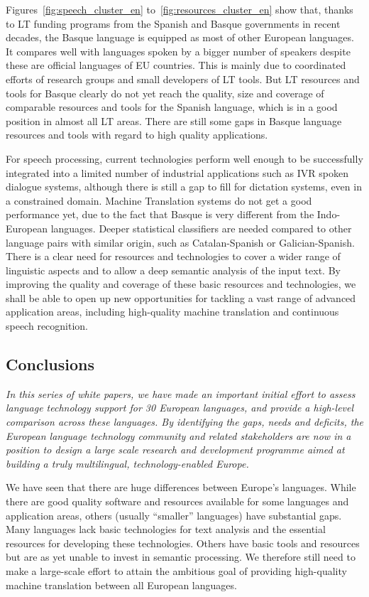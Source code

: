 \begin{multicols}{2}
Figures~\ref{fig:speech_cluster_en} to~\ref{fig:resources_cluster_en} show that, thanks to LT funding programs from the Spanish and Basque governments in recent decades, the Basque language is equipped as most of other European languages. It compares well with languages spoken by a bigger number of speakers despite these are official languages of EU countries. This is mainly due to coordinated efforts of research groups and small developers of LT tools. But LT resources and tools for Basque clearly do not yet reach the quality, size and coverage of comparable resources and tools for the Spanish language, which is in a good position in almost all LT areas. There are still some gaps in Basque language resources and tools with regard to high quality applications. 

    For speech processing, current technologies perform well enough to be successfully integrated into a limited number of industrial applications such as IVR spoken dialogue systems, although there is still a gap to fill for dictation systems, even in a constrained domain. Machine Translation systems do not get a good performance yet, due to the fact that Basque is very different from the Indo-European languages. Deeper statistical classifiers are needed compared to other language pairs with similar origin, such as Catalan-Spanish or Galician-Spanish. There is a clear need for resources and technologies to cover a wider range of linguistic aspects and to allow a deep semantic analysis of the input text. By improving the quality and coverage of these basic resources and technologies, we shall be able to open up new opportunities for tackling a vast range of advanced application areas, including high-quality machine translation and continuous speech recognition.  

\subsection{Conclusions}

    \emph{In this series of white papers, we have made an important initial effort to assess language technology support for 30 European languages, and provide a high-level comparison across these languages. By identifying the gaps, needs and deficits, the European language technology community and related stakeholders are now in a position to design a large scale research and development programme aimed at building a truly multilingual, technology-enabled Europe.}

    We have seen that there are huge differences between Europe’s languages. While there are good quality software and resources available for some languages and application areas, others (usually “smaller” languages) have substantial gaps. Many languages lack basic technologies for text analysis and the essential resources for developing these technologies. Others have basic tools and resources but are as yet unable to invest in semantic processing. We therefore still need to make a large-scale effort to attain the ambitious goal of providing high-quality machine translation between all European languages.


\end{multicols}
